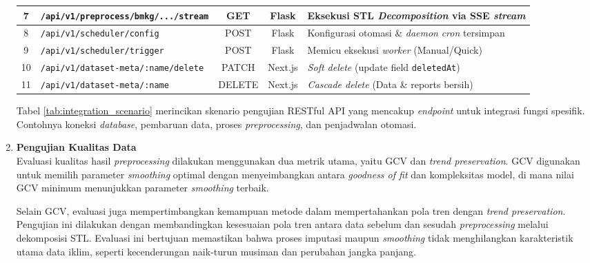 \begin{enumerate}
\begin{table}[H]
\begin{tabular}{|c|l|c|c|p{4.2cm}|}
        7 & \texttt{/api/v1/preprocess/bmkg/.../stream} & GET & Flask & Eksekusi STL \textit{Decomposition} via SSE \textit{stream} \\ \hline
        8 & \texttt{/api/v1/scheduler/config} & POST & Flask & Konfigurasi otomasi \& \textit{daemon} \textit{cron} tersimpan \\ \hline
        9 & \texttt{/api/v1/scheduler/trigger} & POST & Flask & Memicu eksekusi \textit{worker} (Manual/Quick) \\ \hline
        10 & \texttt{/api/v1/dataset-meta/:name/delete} & PATCH & Next.js & \textit{Soft delete} (update field \texttt{deletedAt}) \\ \hline
        11 & \texttt{/api/v1/dataset-meta/:name} & DELETE & Next.js & \textit{Cascade delete} (Data \& reports bersih) \\ \hline
        \end{tabular}
        \end{table}
    Tabel \ref{tab:integration_scenario} merincikan skenario pengujian RESTful API yang mencakup \textit{endpoint} untuk integrasi fungsi spesifik. Contohnya koneksi \textit{database}, pembaruan data, proses \textit{preprocessing}, dan penjadwalan otomasi.

    \item \textbf{Pengujian Kualitas Data} \\
    Evaluasi kualitas hasil \textit{preprocessing} dilakukan menggunakan dua metrik utama, yaitu GCV dan \textit{trend preservation}. GCV digunakan untuk memilih parameter \textit{smoothing} optimal dengan menyeimbangkan antara \textit{goodness of fit} dan kompleksitas model, di mana nilai GCV minimum menunjukkan parameter \textit{smoothing} terbaik.

    Selain GCV, evaluasi juga mempertimbangkan kemampuan metode dalam mempertahankan pola tren dengan \textit{trend preservation}. Pengujian ini dilakukan dengan membandingkan kesesuaian pola tren antara data sebelum dan sesudah \textit{preprocessing} melalui dekomposisi STL. Evaluasi ini bertujuan memastikan bahwa proses imputasi maupun \textit{smoothing} tidak menghilangkan karakteristik utama data iklim, seperti kecenderungan naik-turun musiman dan perubahan jangka panjang.

\end{enumerate}

